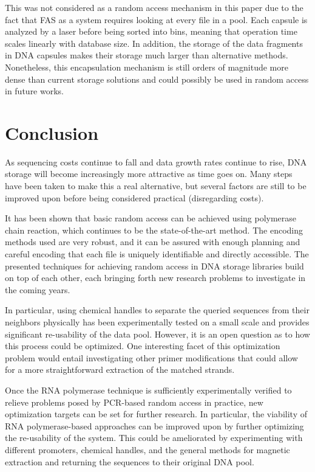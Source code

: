 \documentclass[a4paper,conference]{IEEEtran}
\begin{document}
This was not considered as a random access mechanism in this paper due to the fact that FAS as a system requires looking at every file in a pool. Each capsule is analyzed by a laser before being sorted into bins, meaning that operation time scales linearly with database size. In addition, the storage of the data fragments in DNA capsules makes their storage much larger than alternative methods. Nonetheless, this encapsulation mechanism is still orders of magnitude more dense than current storage solutions and could possibly be used in random access in future works.


\section{Conclusion}
As sequencing costs continue to fall and data growth rates continue to rise, DNA storage will become increasingly more attractive as time goes on. Many steps have been taken to make this a real alternative, but several factors are still to be improved upon before being considered practical (disregarding costs).

It has been shown that basic random access can be achieved using polymerase chain reaction, which continues to be the state-of-the-art method. The encoding methods used are very robust, and it can be assured with enough planning and careful encoding that each file is uniquely identifiable and directly accessible. The presented techniques for achieving random access in DNA storage libraries build on top of each other, each bringing forth new research problems to investigate in the coming years.

In particular, using chemical handles to separate the queried sequences from their neighbors physically has been experimentally tested on a small scale and provides significant re-usability of the data pool. However, it is an open question as to how this process could be optimized. One interesting facet of this optimization problem would entail investigating other primer modifications that could allow for a more straightforward extraction of the matched strands.

Once the RNA polymerase technique is sufficiently experimentally verified to relieve problems posed by PCR-based random access in practice, new optimization targets can be set for further research. In particular, the viability of RNA polymerase-based approaches can be improved upon by further optimizing the re-usability of the system. This could be ameliorated by experimenting with different promoters, chemical handles, and the general methods for magnetic extraction and returning the sequences to their original DNA pool. 





\end{document}
